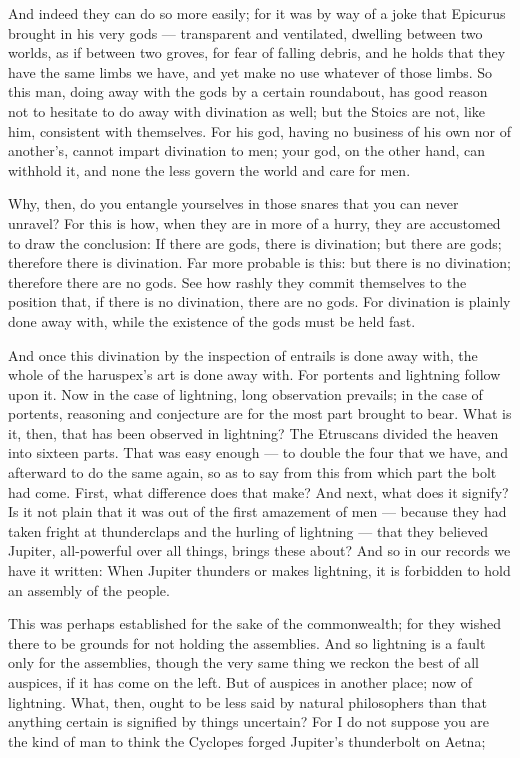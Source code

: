  And indeed they can do so more easily; for it was by way of a joke that Epicurus brought in his very gods — transparent and ventilated, dwelling between two worlds, as if between two groves, for fear of falling debris, and he holds that they have the same limbs we have, and yet make no use whatever of those limbs. So this man, doing away with the gods by a certain roundabout, has good reason not to hesitate to do away with divination as well; but the Stoics are not, like him, consistent with themselves. For his god, having no business of his own nor of another's, cannot impart divination to men; your god, on the other hand, can withhold it, and none the less govern the world and care for men.

 Why, then, do you entangle yourselves in those snares that you can never unravel? For this is how, when they are in more of a hurry, they are accustomed to draw the conclusion: If there are gods, there is divination; but there are gods; therefore there is divination. Far more probable is this: but there is no divination; therefore there are no gods. See how rashly they commit themselves to the position that, if there is no divination, there are no gods. For divination is plainly done away with, while the existence of the gods must be held fast.

 And once this divination by the inspection of entrails is done away with, the whole of the haruspex's art is done away with. For portents and lightning follow upon it. Now in the case of lightning, long observation prevails; in the case of portents, reasoning and conjecture are for the most part brought to bear. What is it, then, that has been observed in lightning? The Etruscans divided the heaven into sixteen parts. That was easy enough — to double the four that we have, and afterward to do the same again, so as to say from this from which part the bolt had come. First, what difference does that make? And next, what does it signify? Is it not plain that it was out of the first amazement of men — because they had taken fright at thunderclaps and the hurling of lightning — that they believed Jupiter, all-powerful over all things, brings these about? And so in our records we have it written: When Jupiter thunders or makes lightning, it is forbidden to hold an assembly of the people.

 This was perhaps established for the sake of the commonwealth; for they wished there to be grounds for not holding the assemblies. And so lightning is a fault only for the assemblies, though the very same thing we reckon the best of all auspices, if it has come on the left. But of auspices in another place; now of lightning. What, then, ought to be less said by natural philosophers than that anything certain is signified by things uncertain? For I do not suppose you are the kind of man to think the Cyclopes forged Jupiter's thunderbolt on Aetna;

